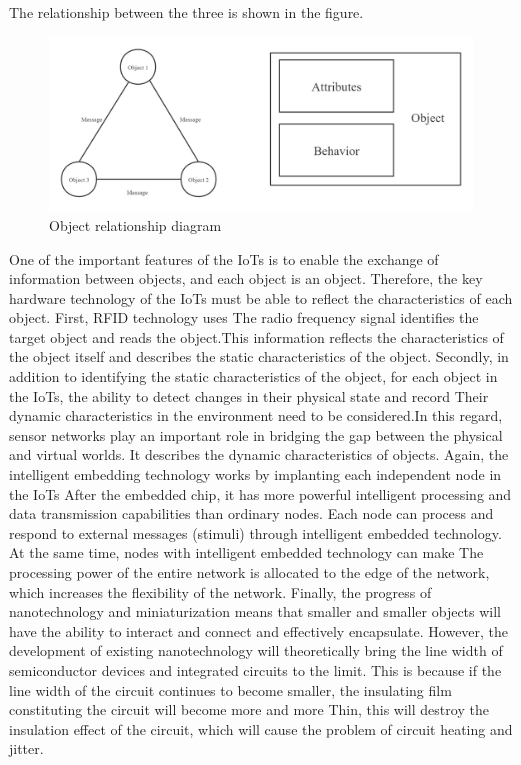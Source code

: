 \documentclass[a4paper,11pt]{article}
\begin{document}
The relationship between the three is shown in the figure.
\begin{figure}[H]
\centering
\includegraphics[width=6.5in]{figures/2.png}
\caption{Object relationship diagram}
\end{figure}
One of the important features of the IoTs is to enable the exchange of information between objects, and each object is an object. Therefore, the key hardware technology of the IoTs must be able to reflect the characteristics of each object. First, RFID technology\cite{7} uses The radio frequency signal identifies the target object and reads the object.This information reflects the characteristics of the object itself and describes the static characteristics of the object. Secondly, in addition to identifying the static characteristics of the object, for each object in the IoTs, the ability to detect changes in their physical state and record Their dynamic characteristics in the environment need to be considered.In this regard, sensor networks play an important role in bridging the gap between the physical and virtual worlds. It describes the dynamic characteristics of objects. Again, the intelligent embedding technology works by implanting each independent node in the IoTs After the embedded chip, it has more powerful intelligent processing and data transmission capabilities than ordinary nodes. Each node can process and respond to external messages (stimuli) through intelligent embedded technology. At the same time, nodes with intelligent embedded technology can make The processing power of the entire network is allocated to the edge of the network, which increases the flexibility of the network. Finally, the progress of nanotechnology and miniaturization means that smaller and smaller objects will have the ability to interact and connect and effectively encapsulate\cite{8}. However, the development of existing nanotechnology will theoretically bring the line width of semiconductor devices and integrated circuits to the limit. This is because if the line width of the circuit continues to become smaller, the insulating film constituting the circuit will become more and more Thin, this will destroy the insulation effect of the circuit, which will cause the problem of circuit heating and jitter.
\end{document}
